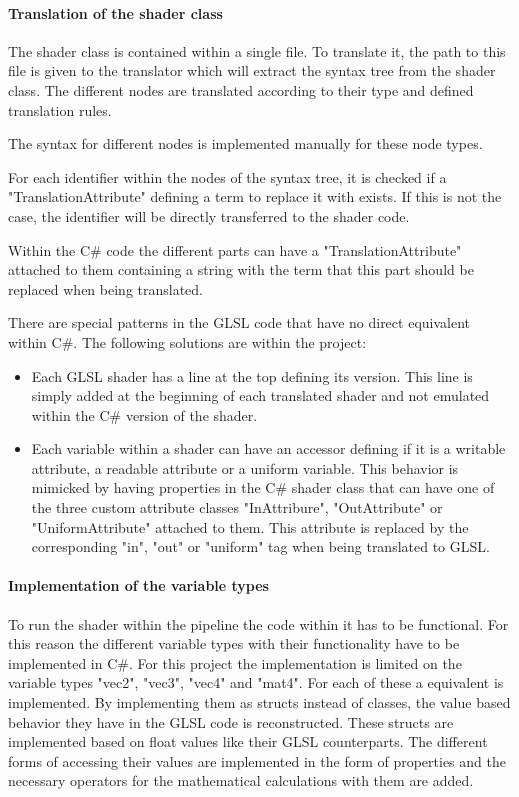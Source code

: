 \paragraph{Translation of the shader class}

The shader class is contained within a single file. To translate it, the path to this file is given to the translator which will extract the syntax tree from the shader class. The different nodes are translated according to their type and defined translation rules.

The syntax for different nodes is implemented manually for these node types.

For each identifier within the nodes of the syntax tree, it is checked if a "TranslationAttribute" defining a term to replace it with exists. If this is not the case, the identifier will be directly transferred to the shader code.

Within the C\# code the different parts can have a "TranslationAttribute" attached to them containing a string with the term that this part should be replaced when being translated.

There are special patterns in the GLSL code that have no direct equivalent within C\#. The following solutions are within the project:
\begin{itemize}
\item Each GLSL shader has a line at the top defining its version. This line is simply added at the beginning of each translated shader and not emulated within the C\# version of the shader.
\item Each variable within a shader can have an accessor defining if it is a writable attribute, a readable attribute or a uniform variable. This behavior is mimicked by having properties in the C\# shader class that can have one of the three custom attribute classes "InAttribure", "OutAttribute" or "UniformAttribute" attached to them. This attribute is replaced by the corresponding "in", "out" or "uniform" tag when being translated to GLSL.
\end{itemize}

\paragraph{Implementation of the variable types}

To run the shader within the pipeline the code within it has to be functional. For this reason the different variable types with their functionality have to be implemented in C\#. For this project the implementation is limited on the variable types "vec2", "vec3", "vec4" and "mat4". For each of these a equivalent is implemented. By implementing them as structs instead of classes, the value based behavior they have in the GLSL code is reconstructed. These structs are implemented based on float values like their GLSL counterparts. The different forms of accessing their values are implemented in the form of properties and the necessary operators for the mathematical calculations with them are added.

